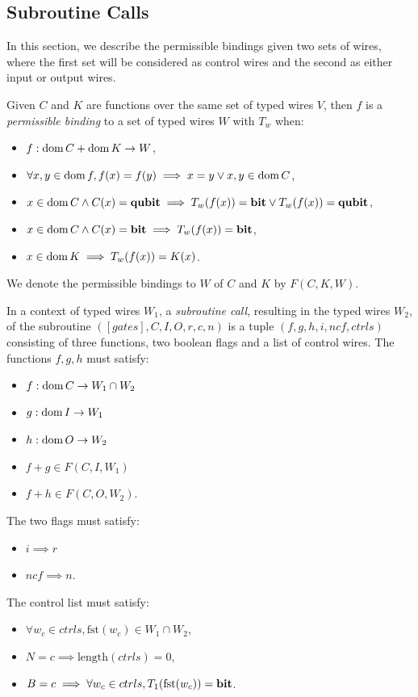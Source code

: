 

\subsection{Subroutine Calls} %
\label{sub:subroutine_calls}

In this section, we describe the permissible bindings given two sets of wires, where the first set
will be considered as control wires and the second as either input or output wires.
\begin{definition}\label{def:permissible_bindings}
  Given $C$ and $K$ are  functions over the same set of typed wires $V$, then $f$ is a
  \emph{permissible binding} to a set of typed wires $W$ with  $T_w$ when:
  \begin{itemize}
    \item $f: \operatorname*{dom} C + \operatorname*{dom} K \to W$,
    \item $\forall x, y\in \operatorname*{dom} f, f(x)=f(y) \implies x=y \vee x,y\in \operatorname*{dom} C$,
    \item $x\in \operatorname*{dom} C \wedge C(x) = \mathbf{{qubit}} \implies T_w(f(x)) = \mathbf{{bit}} \vee T_w(f(x)) = \mathbf{{qubit}}$,
    \item $x\in \operatorname*{dom} C \wedge C(x) = \mathbf{{bit}} \implies T_w(f(x)) = \mathbf{{bit}}$,
    \item $x\in \operatorname*{dom} K  \implies T_w(f(x)) = K(x)$.
  \end{itemize}
\end{definition}

We denote the permissible bindings to $W$ of $C$ and $K$ by $F(C,K,W)$.

\begin{definition}\label{def:subroutine_call}
  In a context of typed wires $W_1$, a \emph{subroutine call}, resulting in the typed wires $W_2$,
  of the subroutine $([gates],C,I,O,r,c,n)$ is a tuple $(f,g,h,i,ncf,ctrls)$ consisting of three
  functions, two boolean flags and a list of control wires. The functions $f,g,h$ must satisfy:
  \begin{itemize}
    \item $f:\operatorname*{dom} C \to W_1 \cap W_2$
    \item $g:\operatorname*{dom} I \to W_1$
    \item $h:\operatorname*{dom} O \to W_2$
    \item $f + g \in F(C,I,W_1)$
    \item $f + h \in F(C,O,W_2)$.
  \end{itemize}
  The two flags must satisfy:
  \begin{itemize}
    \item $i \implies r$
    \item $ncf \implies n$.
  \end{itemize}
  The control list must satisfy:
  \begin{itemize}
    \item $\forall w_c \in ctrls, \text{fst}(w_c) \in W_1 \cap W_2$,
    \item $N = c \implies \text{length}(ctrls) = 0$,
    \item $B = c \implies \forall w_c \in ctrls, T_1(\text{fst}(w_c)) = \mathbf{{bit}}$.
  \end{itemize}
\end{definition}


